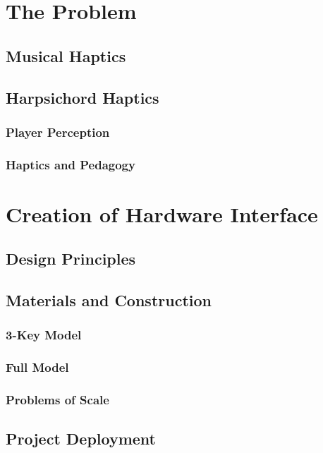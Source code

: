 \section{The Problem}\label{the-problem-3}

\subsection{Musical Haptics}\label{musical-haptics}

\subsection{Harpsichord Haptics}\label{harpsichord-haptics}

\subsubsection{Player Perception}\label{musical-haptics}
\subsubsection{Haptics and Pedagogy}\label{musical-haptics}

\section{Creation of Hardware Interface}\label{the-solution-2}
\subsection{Design Principles}\label{design}
\subsection{Materials and Construction}
\subsubsection{3-Key Model}
\subsubsection{Full Model}
\subsubsection{Problems of Scale}

\subsection{Project Deployment}
